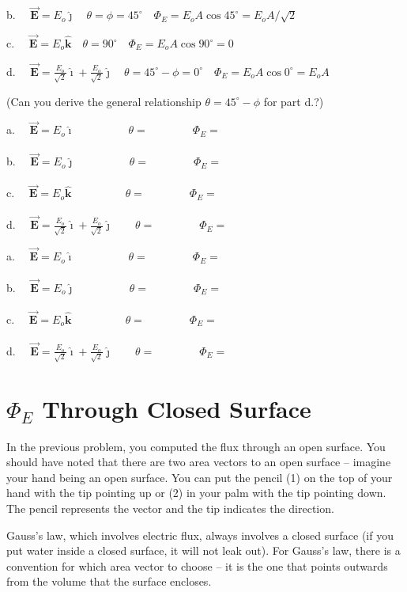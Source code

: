 \documentclass{article}
\newcommand{\ds}[0]{\displaystyle}
\newcommand{\ihat}[0]{\hat{\boldsymbol{\imath}}}
\newcommand{\jhat}[0]{\hat{\boldsymbol{\jmath}}}
\newcommand{\khat}[0]{\hat{\boldsymbol{k}}}
\newcommand{\bfvec}[1]{\vec{\mathbf{#1}}}
\begin{document}
b. $\quad\ds\bfvec{E}=E_o\jhat\quad\theta=\phi=45^\circ\quad\Phi_E=E_oA\cos 45^\circ=E_oA/\sqrt{2}$ 

c. $\quad\ds\bfvec{E}=E_o\khat\quad\theta=90^\circ\quad\Phi_E=E_oA\cos 90^\circ=0$ 

d. $\quad\ds\bfvec{E}=\frac{E_o}{\sqrt{2}}\ihat + \frac{E_o}{\sqrt{2}}\jhat\quad\theta=45^\circ-\phi=0^\circ\quad\Phi_E=E_oA\cos 0^\circ=E_oA$

(Can you derive the general relationship $\theta=45^\circ-\phi$ for part d.?)
\else



a. $\quad\ds\bfvec{E}=E_o\ihat\qquad\phantom{+\frac{E_o}{\sqrt{2}}\jhat}\theta=\qquad\qquad\Phi_E=$

b. $\quad\ds\bfvec{E}=E_o\jhat\qquad\phantom{+ \frac{E_o}{\sqrt{2}}\jhat}\theta=\qquad\qquad\Phi_E=$ 

c. $\quad\ds\bfvec{E}=E_o\khat\qquad\phantom{+\frac{E_o}{\sqrt{2}}\jhat}\theta=\qquad\qquad\Phi_E=$ 

d. $\quad\ds\bfvec{E}=\frac{E_o}{\sqrt{2}}\ihat + \frac{E_o}{\sqrt{2}}\jhat\qquad\theta=\qquad\qquad\Phi_E=$
\fi
\ifsolutions\else


  a. $\quad\ds\bfvec{E}=E_o\ihat\qquad\phantom{+\frac{E_o}{\sqrt{2}}\jhat}\theta=\qquad\qquad\Phi_E=$

  b. $\quad\ds\bfvec{E}=E_o\jhat\qquad\phantom{+ \frac{E_o}{\sqrt{2}}\jhat}\theta=\qquad\qquad\Phi_E=$ 

  c. $\quad\ds\bfvec{E}=E_o\khat\qquad\phantom{+\frac{E_o}{\sqrt{2}}\jhat}\theta=\qquad\qquad\Phi_E=$ 

  d. $\quad\ds\bfvec{E}=\frac{E_o}{\sqrt{2}}\ihat + \frac{E_o}{\sqrt{2}}\jhat\qquad\theta=\qquad\qquad\Phi_E=$
\fi

\section{$\Phi_E$ Through Closed Surface}

In the previous problem, you computed the flux through an open surface. You should have noted that there are two area vectors to an open surface -- imagine your hand being an open surface. You can put the pencil (1) on the top of your hand with the tip pointing up or (2) in your palm with the tip pointing down. The pencil represents the vector and the tip indicates the direction.

Gauss's law, which involves electric flux, always involves a closed surface (if you put water inside a closed surface, it will not leak out). For Gauss's law, there is a convention for which area vector to choose -- it is the one that points outwards from the volume that the surface encloses. 
\end{document}
